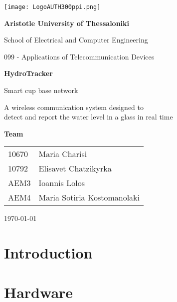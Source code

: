 \documentclass{article}
\begin{document}
\begin{titlepage}
    \centering
    \texttt{[image: LogoAUTH300ppi.png]}
    \par\vspace{2cm}

    {\Large \textbf{Aristotle University of Thessaloniki} \par}
    \vspace{0.5cm}
    {\large School of Electrical and Computer Engineering\par}
    {\large 099 - Applications of Telecommunication Devices\par}
    \vspace{3cm}

    {\Large \textbf{HydroTracker} \par}
    {\large Smart cup base network \par}
    { A wireless communication system designed to \\ detect and report the water level in a glass in real time \par}
    \vspace{3cm}

    {\large \textbf{Team} \par}
    \vspace{0.5cm}
    \begin{tabular}{ll}
    10670 & Maria Charisi \\
    10792 & Elisavet Chatzikyrka \\
    AEM3 & Ioannis Lolos\\
    AEM4 & Maria Sotiria Kostomanolaki \\
    \end{tabular}
    \par\vspace{3cm}

    {\today \par}

\end{titlepage}

\tableofcontents 

\newpage 

\section{Introduction}


\section{Hardware}

\end{document}

